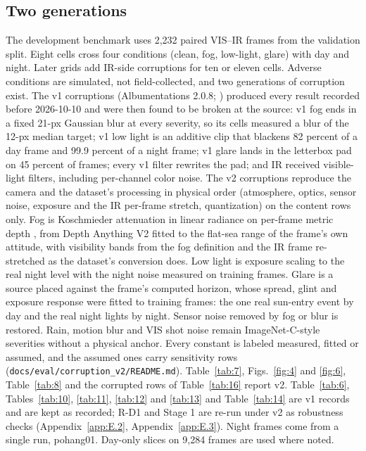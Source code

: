 \documentclass[journal,onecolumn]{IEEEtran}
\begin{document}
\subsection{Two generations}\label{app:B.1}
The development benchmark uses 2,232 paired VIS--IR frames from the validation split. Eight cells cross four conditions (clean, fog, low-light, glare) with day and night. Later grids add IR-side corruptions for ten or eleven cells. Adverse conditions are simulated, not field-collected, and two generations of corruption exist. The v1 corruptions (Albumentations 2.0.8; \cite{buslaev2020albumentations}) produced every result recorded before 2026-10-10 and were then found to be broken at the source: v1 fog ends in a fixed 21-px Gaussian blur at every severity, so its cells measured a blur of the 12-px median target; v1 low light is an additive clip that blackens 82 percent of a day frame and 99.9 percent of a night frame; v1 glare lands in the letterbox pad on 45 percent of frames; every v1 filter rewrites the pad; and IR received visible-light filters, including per-channel color noise. The v2 corruptions reproduce the camera and the dataset's processing in physical order (atmosphere, optics, sensor noise, exposure and the IR per-frame stretch, quantization) on the content rows only. Fog is Koschmieder attenuation in linear radiance on per-frame metric depth \cite{sakaridis2018semantic}, from Depth Anything V2 \cite{yang2024depth} fitted to the flat-sea range of the frame's own attitude, with visibility bands from the fog definition and the IR frame re-stretched as the dataset's conversion does. Low light is exposure scaling to the real night level with the night noise measured on training frames. Glare is a source placed against the frame's computed horizon, whose spread, glint and exposure response were fitted to training frames: the one real sun-entry event by day and the real night lights by night. Sensor noise removed by fog or blur is restored. Rain, motion blur and VIS shot noise remain ImageNet-C-style severities \cite{hendrycks2019benchmarking} without a physical anchor. Every constant is labeled measured, fitted or assumed, and the assumed ones carry sensitivity rows (\texttt{docs/\allowbreak{}eval/\allowbreak{}corruption\_\allowbreak{}v2/\allowbreak{}README.md}). Table~\ref{tab:7}, Figs.~\ref{fig:4} and \ref{fig:6}, Table~\ref{tab:8} and the corrupted rows of Table~\ref{tab:16} report v2. Table~\ref{tab:6}, Tables~\ref{tab:10}, \ref{tab:11}, \ref{tab:12} and \ref{tab:13} and Table~\ref{tab:14} are v1 records and are kept as recorded; R-D1 and Stage 1 are re-run under v2 as robustness checks (Appendix~\ref{app:E.2}, Appendix~\ref{app:E.3}). Night frames come from a single run, pohang01. Day-only slices on 9,284 frames are used where noted.
\end{document}
